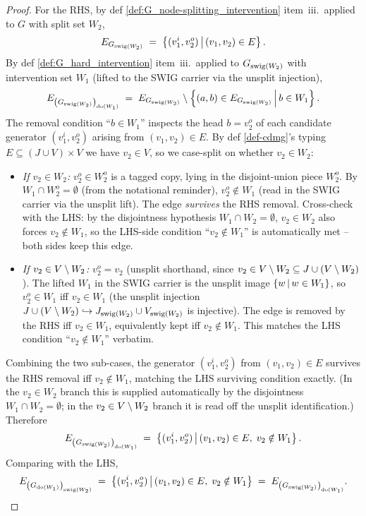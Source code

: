 \documentclass[main]{subfiles}
\begin{document}
\begin{proof}
For the RHS, by def \ref{def:G_node-splitting_intervention} item~iii.\ applied to $G$ with split set $W_2$,
\[
    E_{G_{\mathrm{swig}(W_2)}}
    \;=\; \left \{ (v_1^i, v_2^o) \,\middle|\, (v_1, v_2) \in E \right \}.
\]
By def \ref{def:G_hard_intervention} item~iii.\ applied to $G_{\mathrm{swig}(W_2)}$ with intervention set $W_1$ (lifted to the SWIG carrier via the unsplit injection),
\[
    E_{\left ( G_{\mathrm{swig}(W_2)} \right )_{\operatorname{do}(W_1)}}
    \;=\; E_{G_{\mathrm{swig}(W_2)}} \setminus \left \{ (a, b) \in E_{G_{\mathrm{swig}(W_2)}} \,\middle|\, b \in W_1 \right \}.
\]
The removal condition ``$b \in W_1$'' inspects the head $b = v_2^o$ of each candidate generator $(v_1^i, v_2^o)$ arising from $(v_1, v_2) \in E$. By def \ref{def-cdmg}'s typing $E \subseteq (J \cup V) \times V$ we have $v_2 \in V$, so we case-split on whether $v_2 \in W_2$:
\begin{itemize}
    \item \emph{If $v_2 \in W_2$:} $v_2^o \in W_2^o$ is a tagged copy, lying in the disjoint-union piece $W_2^o$. By $W_1 \cap W_2^o = \emptyset$ (from the notational reminder), $v_2^o \notin W_1$ (read in the SWIG carrier via the unsplit lift). The edge \emph{survives} the RHS removal. Cross-check with the LHS: by the disjointness hypothesis $W_1 \cap W_2 = \emptyset$, $v_2 \in W_2$ also forces $v_2 \notin W_1$, so the LHS-side condition ``$v_2 \notin W_1$'' is automatically met -- both sides keep this edge.
    \item \emph{If $v_2 \in V \setminus W_2$:} $v_2^o = v_2$ (unsplit shorthand, since $v_2 \in V \setminus W_2 \subseteq J \cup (V \setminus W_2)$). The lifted $W_1$ in the SWIG carrier is the unsplit image $\left \{ w \,\middle|\, w \in W_1 \right \}$, so $v_2^o \in W_1$ iff $v_2 \in W_1$ (the unsplit injection $J \cup (V \setminus W_2) \hookrightarrow J_{\mathrm{swig}(W_2)} \cup V_{\mathrm{swig}(W_2)}$ is injective). The edge is removed by the RHS iff $v_2 \in W_1$, equivalently kept iff $v_2 \notin W_1$. This matches the LHS condition ``$v_2 \notin W_1$'' verbatim.
\end{itemize}
Combining the two sub-cases, the generator $(v_1^i, v_2^o)$ from $(v_1, v_2) \in E$ survives the RHS removal iff $v_2 \notin W_1$, matching the LHS surviving condition exactly. (In the $v_2 \in W_2$ branch this is supplied automatically by the disjointness $W_1 \cap W_2 = \emptyset$; in the $v_2 \in V \setminus W_2$ branch it is read off the unsplit identification.) Therefore
\[
    E_{\left ( G_{\mathrm{swig}(W_2)} \right )_{\operatorname{do}(W_1)}}
    \;=\; \left \{ (v_1^i, v_2^o) \,\middle|\, (v_1, v_2) \in E,\; v_2 \notin W_1 \right \}.
\]
Comparing with the LHS,
\[
    E_{\left ( G_{\operatorname{do}(W_1)} \right )_{\mathrm{swig}(W_2)}}
    \;=\; \left \{ (v_1^i, v_2^o) \,\middle|\, (v_1, v_2) \in E,\; v_2 \notin W_1 \right \}
    \;=\; E_{\left ( G_{\mathrm{swig}(W_2)} \right )_{\operatorname{do}(W_1)}}.
\]
\checkmark


\end{proof}
\end{document}
